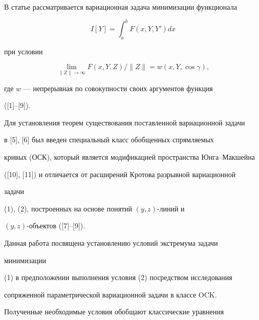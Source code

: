 \maketitle 


\label{begin} 


 


 


В статье рассматривается вариационная задача минимизации функционала 


\begin{equation} 


I[Y]=\int^b_a F(x,Y,Y')dx 


\end{equation} 


при условии 


\begin{equation} 


\lim_{\|Z\|\to\infty}F(x,Y,Z)/\|Z\|=w(x,Y,\cos\gamma), 


\end{equation} 


где $w$ --- непрерывная по совокупности своих аргументов функция 


([1]--[9]). 


 


Для установления теорем существования поставленной вариационной задачи 


в [5], [6] был введен специальный класс обобщенных спрямляемых 


кривых (ОСК), который является модификацией пространства Юнга--Макшейна 


([10], [11]) и отличается от расширений Кротова разрывной вариационной 


задачи 


(1), (2), построенных на основе понятий $(y,z)$-линий и 


$(y,z)$-объектов ([7]--[9]). 


 


Данная работа посвящена установлению условий экстремума задачи 


минимизации 


(1) в предположении выполнения условия (2) посредством исследования 


сопряженной параметрической вариационной задачи в классе OCK. 


Полученные необходимые условия обобщают классические уравнения 


